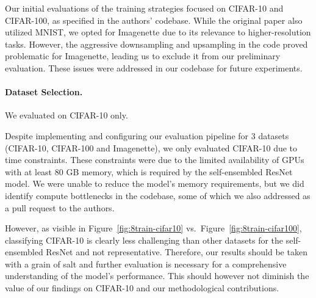 \documentclass[a4paper, oneside]{discothesis}
\begin{document}
Our initial evaluations of the training strategies focused on CIFAR-10 and CIFAR-100, as specified in the authors' codebase. While the original paper also utilized MNIST, we opted for Imagenette due to its relevance to higher-resolution tasks. However, the aggressive downsampling and upsampling in the code proved problematic for Imagenette, leading us to exclude it from our preliminary evaluation. These issues were addressed in our codebase for future experiments.

\paragraph{Dataset Selection.}

We evaluated on CIFAR-10 only.

Despite implementing and configuring our evaluation pipeline for 3 datasets (CIFAR-10, CIFAR-100 and Imagenette), we only evaluated CIFAR-10 due to time constraints. These constraints were due to the limited availability of GPUs with at least 80 GB memory, which is required by the self-ensembled ResNet model. We were unable to reduce the model's memory requirements, but we did identify compute bottlenecks in the codebase, some of which we also addressed as a pull request to the authors.

However, as visible in Figure~\ref{fig:8train-cifar10} vs.\ Figure~\ref{fig:8train-cifar100}, classifying CIFAR-10 is clearly less challenging than other datasets for the self-ensembled ResNet and not representative. Therefore, our results should be taken with a grain of salt and further evaluation is necessary for a comprehensive understanding of the model's performance. This should however not diminish the value of our findings on CIFAR-10 and our methodological contributions.
\end{document}
